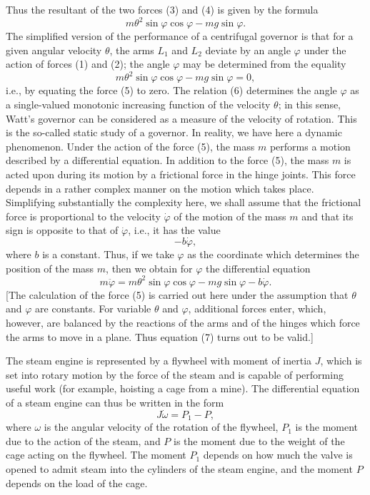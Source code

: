 \documentclass[10pt,a5paper]{book}
\theoremstyle{plain}
\theoremstyle{definition}
\theoremstyle{remark}
\begin{document}
Thus the resultant of the two forces (3) and (4) is given by the formula
\begin{equation*}
m \theta^{2} \sin \varphi \cos \varphi-m g \sin \varphi . \tag{5}
\end{equation*}
The simplified version of the performance of a centrifugal governor is that for a given angular velocity $\theta$, the arms $L_{1}$ and $L_{2}$ deviate by an angle $\varphi$ under the action of forces (1) and (2); the angle $\varphi$ may be determined from the equality
\begin{equation*}
m \theta^{2} \sin \varphi \cos \varphi-m g \sin \varphi=0, \tag{6}
\end{equation*}
i.e., by equating the force (5) to zero. The relation (6) determines the angle $\varphi$ as a single-valued monotonic increasing function of the velocity $\theta$; in this sense, Watt's governor can be considered as a measure of the velocity of rotation. This is the so-called static study of a governor. In reality, we have here a dynamic phenomenon. Under the action of the force (5), the mass $m$ performs a motion described by a differential equation. In addition to the force (5), the mass $m$ is acted upon during its motion by a frictional force in the hinge joints. This force depends in a rather complex manner
on the motion which takes place. Simplifying substantially the complexity here, we shall assume that the frictional force is proportional to the velocity $\dot{\varphi}$ of the motion of the mass $m$ and that its sign is opposite to that of $\dot{\varphi}$, i.e., it has the value
\[
-b \dot{\varphi},
\]
where $b$ is a constant. Thus, if we take $\varphi$ as the coordinate which determines the position of the mass $m$, then we obtain for $\varphi$ the differential equation
\begin{equation*}
m \ddot{\varphi}=m \theta^{2} \sin \varphi \cos \varphi-m g \sin \varphi-b \dot{\varphi} . \tag{7}
\end{equation*}
[The calculation of the force (5) is carried out here under the assumption that $\theta$ and $\varphi$ are constants. For variable $\theta$ and $\varphi$, additional forces enter, which, however, are balanced by the reactions of the arms and of the hinges which force the arms to move in a plane. Thus equation (7) turns out to be valid.]

The steam engine is represented by a flywheel with moment of inertia $J$, which is set into rotary motion by the force of the steam and is capable of performing useful work (for example, hoisting a cage from a mine). The differential equation of a steam engine can thus be written in the form
\begin{equation*}
J \dot{\omega}=P_{1}-P, \tag{8}
\end{equation*}
where $\omega$ is the angular velocity of the rotation of the flywheel, $P_{1}$ is the moment due to the action of the steam, and $P$ is the moment due to the weight of the cage acting on the flywheel. The moment $P_{1}$ depends on how much the valve is opened to admit steam into the cylinders of the steam engine, and the moment $P$ depends on the load of the cage.
\end{document}
